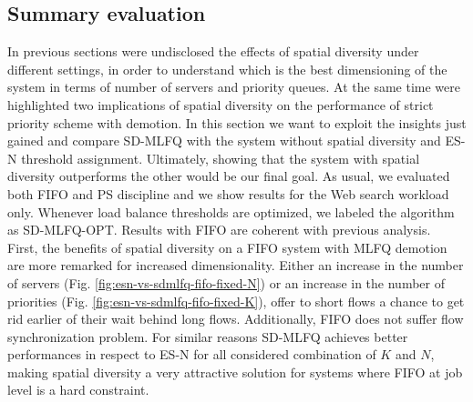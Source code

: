 \subsection{Summary evaluation}
\label{sec:final-comparison}
In previous sections were undisclosed the effects of spatial diversity under different settings, in order to understand which is the best dimensioning of the system in terms of number of servers and priority queues. At the same time were highlighted two implications of spatial diversity on the performance of strict priority scheme with demotion. In this section we want to exploit the insights just gained and compare SD-MLFQ with the system without spatial diversity and ES-N threshold assignment. Ultimately, showing that the system with spatial diversity outperforms the other would be our final goal. As usual, we evaluated both FIFO and PS discipline and we show results for the Web search workload only. Whenever load balance thresholds are optimized, we labeled the algorithm as SD-MLFQ-OPT. Results with FIFO are coherent with previous analysis. \\
First, the benefits of spatial diversity on a FIFO system with MLFQ demotion are more remarked for increased dimensionality. Either an increase in the number of servers (Fig. \ref{fig:esn-vs-sdmlfq-fifo-fixed-N}) or an increase in the number of priorities (Fig. \ref{fig:esn-vs-sdmlfq-fifo-fixed-K}), offer to short flows a chance to get rid earlier of their wait behind long flows. Additionally, FIFO does not suffer flow synchronization problem. For similar reasons SD-MLFQ achieves better performances in respect to ES-N for all considered combination of $K$ and $N$, making spatial diversity a very attractive solution for systems where FIFO at job level is a hard constraint.

